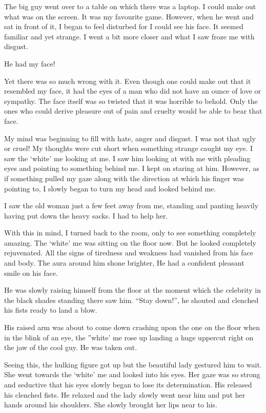 \documentclass[twoside,11pt]{article}
\begin{document}
The big guy went over to a table on which there was a laptop. I could make out what was on the screen. It was my favourite game. However, when he went and sat in front of it, I began to feel disturbed for I could see his face. It seemed familiar and yet strange. I went a bit more closer and what I saw froze me with disgust.

He had my face!

Yet there was so much wrong with it. Even though one could make out that it resembled my face, it had the eyes of a man who did not have an ounce of love or sympathy. The face itself was so twisted that it was horrible to behold. Only the ones who could derive pleasure out of pain and cruelty would be able to bear that face.

My mind was beginning to fill with hate, anger and disgust. I was not that ugly or cruel! My thoughts were cut short when something strange caught my eye. I saw the ‘white’ me looking at me. I saw him looking at with me with pleading eyes and pointing to something behind me. I kept on staring at him. However, as if something pulled my gaze along with the direction at which his finger was pointing to, I slowly began to turn my head and looked behind me.

I saw the old woman just a few feet away from me, standing and panting heavily having put down the heavy sacks. I had to help her.

With this in mind, I turned back to the room, only to see something completely amazing. The ‘white’ me was sitting on the floor now. But he looked completely rejuvenated. All the signs of tiredness and weakness had vanished from his face and body. The aura around him shone brighter, He had a confident pleasant smile on his face.

He was slowly raising himself from the floor at the moment which the celebrity in the black shades standing there saw him. “Stay down!”, he shouted and clenched his fists ready to land a blow.

His raised arm was about to come down crashing upon the one on the floor when in the blink of an eye, the ”white’ me rose up landing a huge uppercut right on the jaw of the cool guy. He was taken out.

Seeing this, the hulking figure got up but the beautiful lady gestured him to wait. She went towards the ‘white’ me and looked into his eyes. Her gaze was so strong and seductive that his eyes slowly began to lose its determination. His released his clenched fists. He relaxed and the lady slowly went near him and put her hands around his shoulders. She slowly brought her lips near to his.
\end{document}
